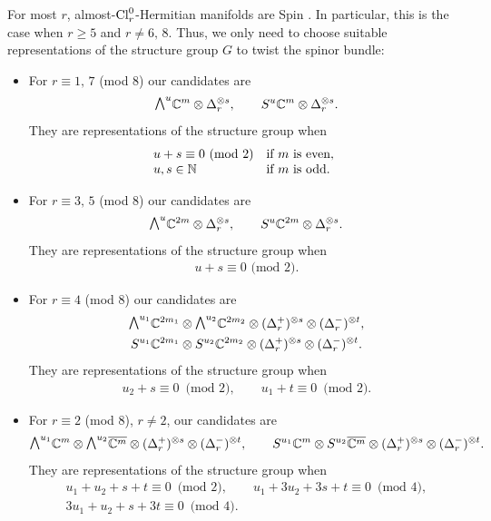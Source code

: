 \documentclass[10pt,a4paper]{amsart}
\newcommand{\ext}{\raise1pt\hbox{$\textstyle\bigwedge$}}
\newcommand{\sym}{S}
\numberwithin{equation}{section}
\begin{document}
For most $r$, almost-${\rm Cl}_r^0$-Hermitian manifolds are Spin \cite[Theorem~4.1]{Arizmendi-Garcia-Herrera}. In particular, this is the case when $r\geq 5$ and $r\not= 6,\,8$. Thus, we only need to choose suitable representations of the structure group $G$ to twist the spinor bundle:
\begin{itemize}\itemsep=0pt
 \item For $r\equiv 1,\,7$ (mod 8) our candidates are
 \begin{gather*}\ext^u \mathbb{C}^m\otimes \Delta_r^{\otimes s}, \qquad \sym^u\mathbb{C}^m\otimes \Delta_r^{\otimes s}.\end{gather*}
 They are representations of the structure group when
 \begin{gather*}\begin{array}{@{}ll}
u+s\equiv 0 \,\,\mbox{(mod 2)}& \text{if $m$ is even}, \\
u,s\in\mathbb{N} & \text{if $m$ is odd}.
 \end{array}
 \end{gather*}

 \item For $r\equiv 3,\,5$ (mod 8) our candidates are
 \begin{gather*}\ext^u \mathbb{C}^{2m}\otimes \Delta_r^{\otimes s},\qquad \sym^u\mathbb{C}^{2m}\otimes \Delta_r^{\otimes s}.\end{gather*}
 They are representations of the structure group when
\begin{gather*}u+s\equiv 0 \,\,\mbox{(mod 2)}.\end{gather*}

 \item For $r\equiv 4$ (mod 8) our candidates are
 \begin{gather*}\ext^{u_1} \mathbb{C}^{2m_1}\otimes \ext^{u_2} \mathbb{C}^{2m_2}\otimes (\Delta_r^+)^{\otimes s}\otimes (\Delta_r^-)^{\otimes t},
\\ \sym^{u_1}\mathbb{C}^{2m_1}\otimes \sym^{u_2}\mathbb{C}^{2m_2}\otimes (\Delta_r^+)^{\otimes s}\otimes (\Delta_r^-)^{\otimes t}.\end{gather*}
 They are representations of the structure group when
 \begin{gather*}
u_2+s \equiv 0 \,\,\,\mbox{(mod 2)},\qquad
u_1+t \equiv 0 \,\,\,\mbox{(mod 2)}.
 \end{gather*}

 \item For $r\equiv 2$ (mod 8), $r\not =2$, our candidates are
 \begin{gather*}\ext^{u_1} \mathbb{C}^{m}\otimes \ext^{u_2} \overline{\mathbb{C}^{m}}\otimes (\Delta_r^+)^{\otimes s}\otimes (\Delta_r^-)^{\otimes t},
 \qquad \sym^{u_1}\mathbb{C}^{m}\otimes \sym^{u_2}\overline{\mathbb{C}^{m}}\otimes (\Delta_r^+)^{\otimes s}\otimes (\Delta_r^-)^{\otimes t}.\end{gather*}
 They are representations of the structure group when
 \begin{gather*}
u_1+u_2+s+t \equiv 0 \,\,\,\mbox{(mod 2)},\qquad u_1+3u_2+3s+t \equiv 0 \,\,\,\mbox{(mod 4)},\\
3u_1+u_2+s+3t \equiv 0 \,\,\,\mbox{(mod 4)}.
 \end{gather*}


\end{itemize}
\end{document}
